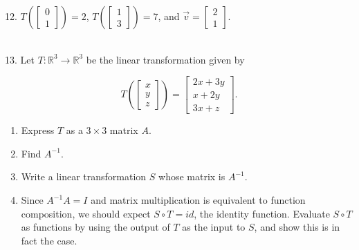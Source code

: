 \documentclass{article}
\begin{document}
12. $T\left( \left[\begin{array}{c} 0 \\ 1 \end{array}\right] \right) = 2$, $T\left( \left[\begin{array}{c} 1 \\ 3 \end{array}\right] \right) = 7$, and $\vec{v} = \left[\begin{array}{c} 2 \\ 1 \end{array}\right]$.

~\\

13. Let $T : \mathbb{R}^3 \to \mathbb{R}^3$ be the linear transformation given by

$$
	T \left( \left[\begin{array}{c} x \\ y \\ z \end{array}\right] \right) = \left[\begin{array}{c} 2x + 3y \\ x + 2y \\ 3x + z \end{array}\right].
$$

\begin{enumerate}

	\item Express $T$ as a $3 \times 3$ matrix $A$.

	\item Find $A^{-1}$.

	\item Write a linear transformation $S$ whose matrix is $A^{-1}$.

	\item Since $A^{-1}A = I$ and matrix multiplication is equivalent to function composition, we should expect $S \circ T = id$, the identity function. Evaluate $S \circ T$ as functions by using the output of $T$ as the input to $S$, and show this is in fact the case.

\end{enumerate}
\end{document}
